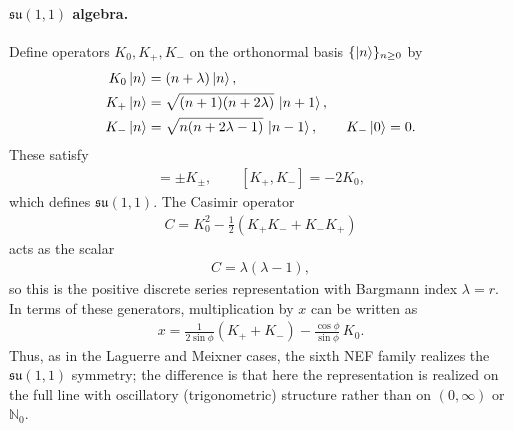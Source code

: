 \documentclass[a4paper,11pt]{article}
\numberwithin{equation}{section}
\theoremstyle{plain}
\theoremstyle{definition}
\theoremstyle{remark}
\newcommand{\1}{\ensuremath{\mathds{1}}\xspace}
\begin{document}
\paragraph{$\mathfrak{su}(1,1)$ algebra.}
Define operators $K_0,K_+,K_-$ on the orthonormal basis $\{\ket{n}\}_{n\ge0}$ by
\begin{align}
K_0\ket{n}&=\left(n+\lambda\right)\ket{n},\\
K_+\ket{n}&=\sqrt{(n+1)(n+2\lambda)}\,\ket{n+1},\\
K_-\ket{n}&=\sqrt{n(n+2\lambda-1)}\,\ket{n-1},
\qquad K_-\ket{0}=0.
\end{align}
These satisfy
\begin{align}
[K_0,K_\pm]=\pm K_\pm,
\qquad
[K_+,K_-]=-2K_0,
\end{align}
which defines $\mathfrak{su}(1,1)$.
The Casimir operator
\begin{align}
C=K_0^2-\frac12(K_+K_-+K_-K_+)
\end{align}
acts as the scalar
\begin{align}
C=\lambda(\lambda-1),
\end{align}
so this is the positive discrete series representation with Bargmann index $\lambda=r$.
In terms of these generators, multiplication by $x$ can be written as
\begin{align}
x
=
\frac{1}{2\sin\phi}(K_+ + K_-)
-
\frac{\cos\phi}{\sin\phi}\,K_0.
\end{align}
Thus, as in the Laguerre and Meixner cases, the sixth NEF family realizes the
$\mathfrak{su}(1,1)$ symmetry; the difference is that here the representation
is realized on the full line with oscillatory (trigonometric) structure rather
than on $(0,\infty)$ or $\mathbb{N}_0$.
\end{document}
